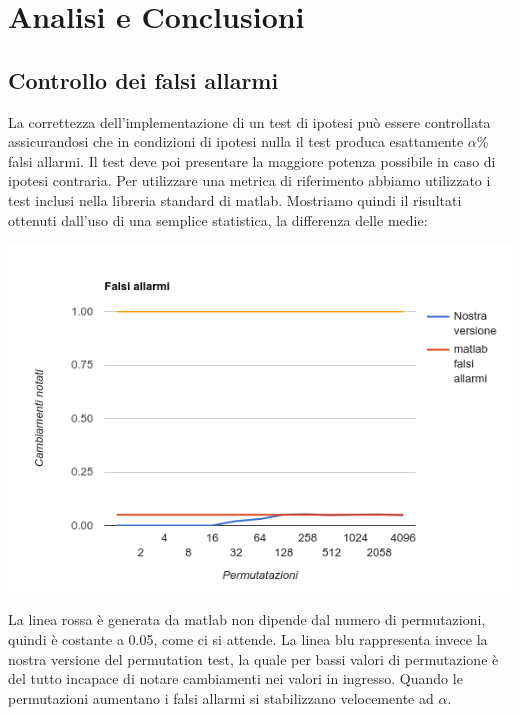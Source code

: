 \section{Analisi e Conclusioni}

\subsection{Controllo dei falsi allarmi}
La correttezza dell'implementazione di un test di ipotesi può essere controllata assicurandosi che in condizioni di ipotesi nulla il test produca esattamente $\alpha$\% falsi allarmi. Il test deve poi presentare la maggiore potenza possibile in caso di ipotesi contraria. Per utilizzare una metrica di riferimento abbiamo utilizzato i test inclusi nella libreria standard di matlab.
Mostriamo quindi il risultati ottenuti dall'uso di una semplice statistica, la differenza delle medie:

\begin{center}
\includegraphics[width=\linewidth]{falsi_allarmi}
\end{center}

La linea rossa è generata da matlab non dipende dal numero di permutazioni, quindi è costante a 0.05, come ci si attende. La linea blu rappresenta invece la nostra versione del permutation test, la quale per bassi valori di permutazione è del tutto incapace di notare cambiamenti nei valori in ingresso. Quando le permutazioni aumentano i falsi allarmi si stabilizzano velocemente ad $\alpha$. 

